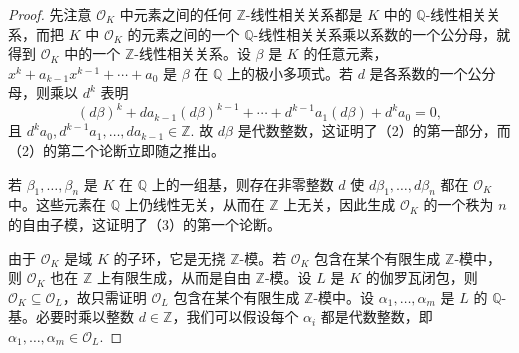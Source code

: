 \begin{proof}
先注意 \(\mathcal{O}_K\) 中元素之间的任何 \(\mathbb{Z}\)-线性相关关系都是 \(K\) 中的 \(\mathbb{Q}\)-线性相关关系，而把 \(K\) 中 \(\mathcal{O}_K\) 的元素之间的一个 \(\mathbb{Q}\)-线性相关关系乘以系数的一个公分母，就得到 \(\mathcal{O}_K\) 中的一个 \(\mathbb{Z}\)-线性相关关系。设 \(\beta\) 是 \(K\) 的任意元素，\(x^k+a_{k-1}x^{k-1}+\cdots+a_0\) 是 \(\beta\) 在 \(\mathbb{Q}\) 上的极小多项式。若 \(d\) 是各系数的一个公分母，则乘以 \(d^k\) 表明
\[
(d\beta)^k+da_{k-1}(d\beta)^{k-1}+\cdots+d^{k-1}a_1(d\beta)+d^ka_0 = 0,
\]
且 \(d^ka_0, d^{k-1}a_1, \ldots, da_{k-1} \in \mathbb{Z}\). 故 \(d\beta\) 是代数整数，这证明了（2）的第一部分，而（2）的第二个论断立即随之推出。

若 \(\beta_1, \ldots, \beta_n\) 是 \(K\) 在 \(\mathbb{Q}\) 上的一组基，则存在非零整数 \(d\) 使 \(d\beta_1, \ldots, d\beta_n\) 都在 \(\mathcal{O}_K\) 中。这些元素在 \(\mathbb{Q}\) 上仍线性无关，从而在 \(\mathbb{Z}\) 上无关，因此生成 \(\mathcal{O}_K\) 的一个秩为 \(n\) 的自由子模，这证明了（3）的第一个论断。

由于 \(\mathcal{O}_K\) 是域 \(K\) 的子环，它是无挠 \(\mathbb{Z}\)-模。若 \(\mathcal{O}_K\) 包含在某个有限生成 \(\mathbb{Z}\)-模中，则 \(\mathcal{O}_K\) 也在 \(\mathbb{Z}\) 上有限生成，从而是自由 \(\mathbb{Z}\)-模。设 \(L\) 是 \(K\) 的伽罗瓦闭包，则 \(\mathcal{O}_K \subseteq \mathcal{O}_L\)，故只需证明 \(\mathcal{O}_L\) 包含在某个有限生成 \(\mathbb{Z}\)-模中。设 \(\alpha_1, \ldots, \alpha_m\) 是 \(L\) 的 \(\mathbb{Q}\)-基。必要时乘以整数 \(d \in \mathbb{Z}\)，我们可以假设每个 \(\alpha_i\) 都是代数整数，即 \(\alpha_1, \ldots, \alpha_m \in \mathcal{O}_L\).


\end{proof}
